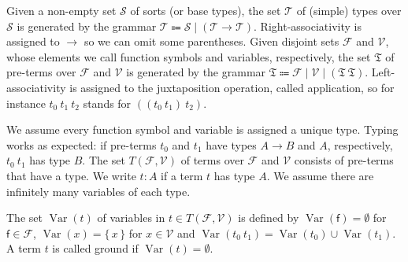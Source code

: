\documentclass[10pt,a4paper]{amsart}
\begin{document}
Given a non-empty set $\mathcal{S}$ of sorts (or base types), the set $\mathcal{T}$ of (simple) types over $\mathcal{S}$ is generated by the grammar $\mathcal{T}\Coloneqq\mathcal{S}\mid(\mathcal{T}\rightarrow\mathcal{T})$. Right-associativity is assigned to $\rightarrow$ so we can omit some parentheses. Given disjoint sets $\mathcal{F}$ and $\mathcal{V}$, whose elements we call function symbols and variables, respectively, the set $\mathfrak{T}$ of pre-terms over $\mathcal{F}$ and $\mathcal{V}$ is generated by the grammar $\mathfrak{T}\Coloneqq\mathcal{F}\mid\mathcal{V}\mid({\mathfrak{T}}\ {\mathfrak{T}})$. Left-associativity is assigned to the juxtaposition operation, called application, so for instance ${{t_{0}}\ {t_{1}}}\ {t_{2}}$ stands for $({({t_{0}}\ {t_{1}})}\ {t_{2}})$.\par
 
 
 
We assume every function symbol and variable is assigned a unique type. Typing works as expected: if pre-terms $t_{0}$ and $t_{1}$ have types $A\rightarrow B$ and $A$, respectively, ${t_{0}}\ {t_{1}}$ has type $B$. The set $T(\mathcal{F},\mathcal{V})$ of terms over $\mathcal{F}$ and $\mathcal{V}$ consists of pre-terms that have a type. We write $t:A$ if a term $t$ has type $A$. We assume there are infinitely many variables of each type.\par
 
 
 
The set $\operatorname{Var}(t)$ of variables in $t\in T(\mathcal{F},\mathcal{V})$ is defined by $\operatorname{Var}(\mathsf{f})=\emptyset$ for $\mathsf{f}\in\mathcal{F}$, $\operatorname{Var}(x)=\{\,x\,\}$ for $x\in\mathcal{V}$ and $\operatorname{Var}({t_{0}}\ {t_{1}})=\operatorname{Var}(t_{0})\cup\operatorname{Var}(t_{1})$. A term $t$ is called ground if $\operatorname{Var}(t)=\emptyset$.\par
 
 
 
\end{document}
